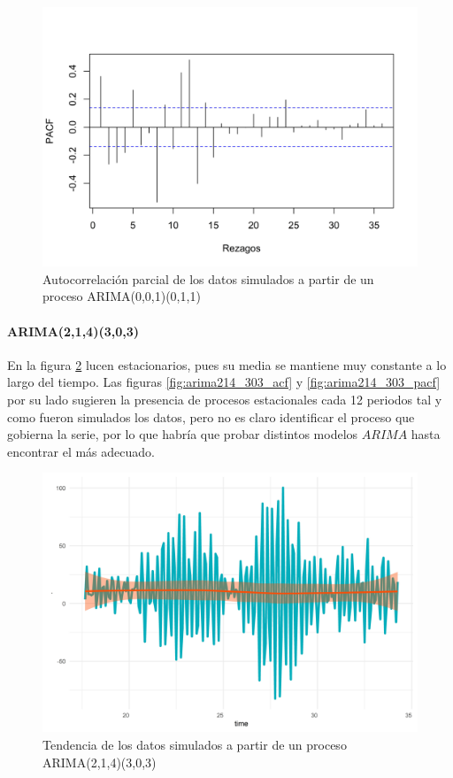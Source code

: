 \documentclass[
]{article}
\begin{document}
\begin{figure}[H]
\includegraphics[width=1\linewidth,height=1\textheight]{Tesis_files/figure-latex/arima001_011_pacf-1} \caption{Autocorrelación parcial de los datos simulados a partir de un proceso ARIMA(0,0,1)(0,1,1)}\label{fig:arima001_011_pacf}
\end{figure}

\paragraph{ARIMA(2,1,4)(3,0,3)}

En la figura \ref{fig:arima214_303_comportamiento} lucen estacionarios,
pues su media se mantiene muy constante a lo largo del tiempo. Las
figuras \ref{fig:arima214_303_acf} y \ref{fig:arima214_303_pacf} por su
lado sugieren la presencia de procesos estacionales cada 12 periodos tal
y como fueron simulados los datos, pero no es claro identificar el
proceso que gobierna la serie, por lo que habría que probar distintos
modelos \(ARIMA\) hasta encontrar el más adecuado.

\begin{figure}[H]
\includegraphics[width=1\linewidth,height=1\textheight]{Tesis_files/figure-latex/arima214_303_comportamiento-1} \caption{Tendencia de los datos simulados a partir de un proceso ARIMA(2,1,4)(3,0,3)}\label{fig:arima214_303_comportamiento}
\end{figure}
\end{document}
